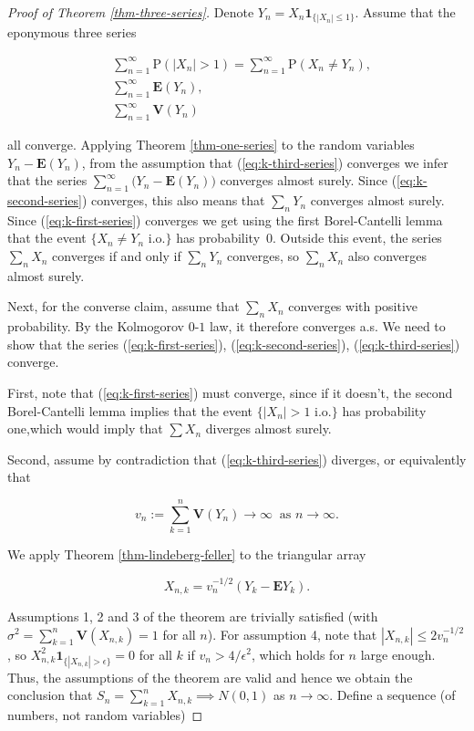 \documentclass[11pt]{report}
\theoremstyle{plain}
\theoremstyle{definition}
\begin{document}
\begin{proof}[Proof of Theorem \ref{thm-three-series}]
Denote $Y_n = X_n \mathbf{1}_{\{|X_n|\le 1\}}$.
Assume that the eponymous three series

\begin{align*}
\tag{27}\label{eq:k-first-series} &\sum_{n=1}^\infty \mathrm{P}(|X_n|>1) = \sum_{n=1}^\infty \mathrm{P}(X_n\neq Y_n), \\
\tag{28}\label{eq:k-second-series} &\sum_{n=1}^\infty \mathbf{E}(Y_n), \\
\tag{29}\label{eq:k-third-series} &\sum_{n=1}^\infty \mathbf{V}(Y_n)
\end{align*}

all converge. Applying Theorem \ref{thm-one-series} to
the random variables $Y_n-\mathbf{E}(Y_n)$, from the
assumption that (\ref{eq:k-third-series}) converges we
infer that the series
$\sum_{n=1}^\infty \big( Y_n-\mathbf{E}(Y_n) \big)$
converges almost surely. Since (\ref{eq:k-second-series})
converges, this also means that $\sum_n Y_n$
converges almost surely. Since (\ref{eq:k-first-series})
converges we get using the first Borel-Cantelli lemma
that the event $\{ X_n \neq Y_n\textrm{ i.o.} \}$ has
probability~$0$. Outside this event, the series
$\sum_n X_n$ converges if and only if $\sum_n Y_n$
converges, so $\sum_n X_n$ also converges almost
surely.

Next, for the converse claim, assume that $\sum_n X_n$
converges with positive probability. By the Kolmogorov
$0$-$1$ law, it therefore converges a.s. We need to
show that the series (\ref{eq:k-first-series}),
(\ref{eq:k-second-series}), (\ref{eq:k-third-series})
converge.

First, note that (\ref{eq:k-first-series}) must converge,
since if it doesn't, the second Borel-Cantelli lemma
implies that the event $\{ |X_n|>1 \textrm{ i.o.} \}$
has probability one,which would imply that $\sum X_n$
diverges almost surely.

Second, assume by contradiction that
(\ref{eq:k-third-series}) diverges, or equivalently that

\[
v_n := \sum_{k=1}^n \mathbf{V}(Y_n) \to \infty\ \textrm{ as }n\to\infty.
\]

We apply Theorem \ref{thm-lindeberg-feller} to the
triangular array

\[
X_{n,k} = v_n^{-1/2} \left(Y_k - \mathbf{E} Y_k\right).
\]

Assumptions 1, 2 and 3 of the theorem are trivially
satisfied (with
$\sigma^2 = \sum_{k=1}^n \mathbf{V}(X_{n,k}) = 1$ for
all $n$). For assumption 4, note that
$|X_{n,k}| \le 2 v_n^{-1/2}$, so
$X_{n,k}^2 \mathbf{1}_{\{|X_{n,k}|>\epsilon\}} = 0$
for all $k$ if $v_n > 4/\epsilon^2$, which holds for
$n$ large enough. Thus, the assumptions of the
theorem are valid and hence we obtain the conclusion
that $S_n=\sum_{k=1}^n X_{n,k} \implies N(0,1)$ as
$n\to\infty$. Define a sequence (of numbers, not
random variables)


\end{proof}
\end{document}

